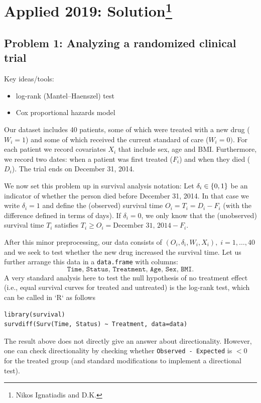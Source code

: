 \section{Applied 2019: Solution\footnote{Nikos Ignatiadis and D.K.}}



\subsection*{Problem 1: Analyzing a randomized clinical trial}

Key ideas/tools:
\begin{itemize}
  \item log-rank (Mantel--Haenszel) test
  \item Cox proportional hazards model
\end{itemize}

Our dataset includes 40 patients, some of which were treated with a new drug ($W_i=1$) and some of which received the current standard of care ($W_i=0)$. For each patient we record covariates $X_i$ that include sex, age and BMI. Furthermore, we record two dates: when a patient was first treated ($F_i$) and when they died ($D_i$). The trial ends on December 31, 2014. 

We now set this problem up in survival analysis notation: Let $\delta_i \in \left\{0,1\right\}$ be an indicator of whether the person died before December 31, 2014. In that case we write $\delta_i=1$ and define the (observed) survival time $O_i=T_i = D_i - F_i$ (with the difference defined in terms of days). If $\delta_i =0$, we only know that the (unobserved) survival time $T_i$ satisfies  $T_i\geq O_i = \text{December 31, 2014} - F_i$.        

After this minor preprocessing, our data consists of $(O_i, \delta_i, W_i, X_i), \; i=1,\dotsc,40$ and we seek to test whether the new drug increased the survival time. Let us further arrange this data in a \texttt{data.frame} with columns: 
$$\texttt{Time, Status, Treatment, Age, Sex, BMI}.$$ 
A very standard analysis here to test the null hypothesis of no treatment effect (i.e., equal survival curves for treated and untreated) is the log-rank test, which can be called in `R` as follows
\begin{verbatim}
library(survival)
survdiff(Surv(Time, Status) ~ Treatment, data=data)
\end{verbatim}
The result above does not directly give an answer about directionality. However, one can check directionality by checking whether \texttt{Observed - Expected} is $<0$ for the treated group (and standard modifications to implement a directional test).

